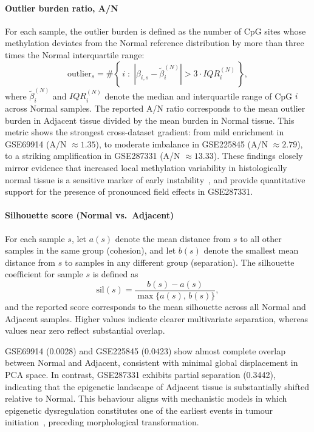 \documentclass[10pt]{extarticle}
\begin{document}
\paragraph{Outlier burden ratio, A/N}  
For each sample, the outlier burden is defined as the number of CpG sites whose methylation 
deviates from the Normal reference distribution by more than three times the Normal 
interquartile range:
\[
\text{outlier}_s = 
\#\left\{\, i \;:\; 
\left| \beta_{i,s} - \tilde{\beta}^{(N)}_i \right| 
> 3 \cdot IQR^{(N)}_i \,\right\},
\]
where $\tilde{\beta}^{(N)}_i$ and $IQR^{(N)}_i$ denote the median and interquartile range of CpG $i$ 
across Normal samples.  
The reported A/N ratio corresponds to the mean outlier burden in Adjacent tissue divided by the 
mean burden in Normal tissue.  
This metric shows the strongest cross-dataset gradient: from mild enrichment in GSE69914 
(A/N $\approx 1.35$), to moderate imbalance in GSE225845 (A/N $\approx 2.79$), to a striking 
amplification in GSE287331 (A/N $\approx 13.33$).  
These findings closely mirror evidence that increased local methylation variability in 
histologically normal tissue is a sensitive marker of early instability~\cite{Yates2024_NormalMucosaField}, 
and provide quantitative support for the presence of pronounced field effects in GSE287331.





\paragraph{Silhouette score (Normal vs.\ Adjacent)}  
For each sample $s$, let $a(s)$ denote the mean distance from $s$ to all other samples in the 
same group (cohesion), and let $b(s)$ denote the smallest mean distance from $s$ to samples in 
any different group (separation).  
The silhouette coefficient for sample $s$ is defined as
\[
\mathrm{sil}(s) =
\frac{b(s) - a(s)}{\max\{a(s),\, b(s)\}},
\]
and the reported score corresponds to the mean silhouette across all Normal and Adjacent 
samples.  
Higher values indicate clearer multivariate separation, whereas values near zero reflect 
substantial overlap.

GSE69914 (0.0028) and GSE225845 (0.0423) show almost complete overlap between Normal and 
Adjacent, consistent with minimal global displacement in PCA space.  
In contrast, GSE287331 exhibits partial separation (0.3442), indicating that the epigenetic 
landscape of Adjacent tissue is substantially shifted relative to Normal.  
This behaviour aligns with mechanistic models in which epigenetic dysregulation constitutes 
one of the earliest events in tumour initiation~\cite{Zhang2024_TumorInitiationEpigenetic}, 
preceding morphological transformation.
\end{document}
